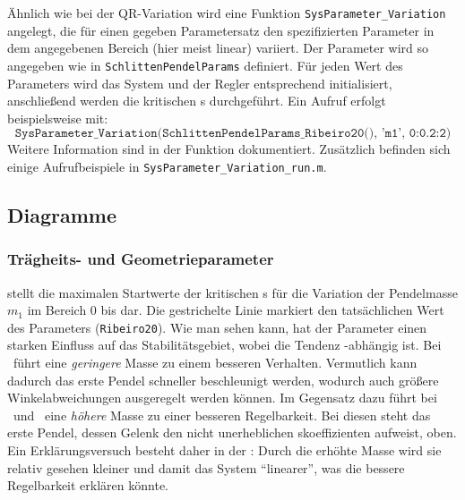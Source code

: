 Ähnlich wie bei der QR-Variation wird eine Funktion \texttt{SysParameter\_Variation} angelegt, die für einen gegeben Parametersatz den spezifizierten Parameter in dem angegebenen Bereich (hier meist linear) variiert.
Der Parameter wird so angegeben wie in \texttt{SchlittenPendelParams} definiert.
Für jeden Wert des Parameters wird das System und der Regler entsprechend initialisiert, anschließend werden die kritischen \xots s durchgeführt.
Ein Aufruf erfolgt beispielsweise mit:
	\[
	\texttt{SysParameter\_Variation(SchlittenPendelParams\_Ribeiro20(), 'm1', 0:0.2:2)}
\]
Weitere Information sind in der Funktion dokumentiert.
Zusätzlich befinden sich einige Aufrufbeispiele in \texttt{SysParameter\_Variation\_run.m}.



\subsection{Diagramme}

\subsubsection{Trägheits- und Geometrieparameter}


 stellt die maximalen Startwerte der kritischen \xots s für die Variation der Pendelmasse $m_1$ im Bereich $0$ bis  dar.
Die gestrichelte Linie markiert den tatsächlichen Wert des Parameters (\texttt{Ribeiro20}).
Wie man sehen kann, hat der Parameter einen starken Einfluss auf das Stabilitätsgebiet, wobei die Tendenz \ap-abhängig ist.
Bei \apz\ führt eine \emph{geringere} Masse zu einem besseren Verhalten.
Vermutlich kann dadurch das erste Pendel schneller beschleunigt werden, wodurch auch größere Winkelabweichungen ausgeregelt werden können.
Im Gegensatz dazu führt bei \apd\ und \apv\ eine \emph{höhere} Masse zu einer besseren Regelbarkeit.
Bei diesen steht das erste Pendel, dessen Gelenk den nicht unerheblichen \crb skoeffizienten aufweist, oben.
Ein Erklärungsversuch besteht daher in der \crb: Durch die erhöhte Masse wird sie relativ gesehen kleiner und damit das System "`linearer"', was die bessere Regelbarkeit erklären könnte.

